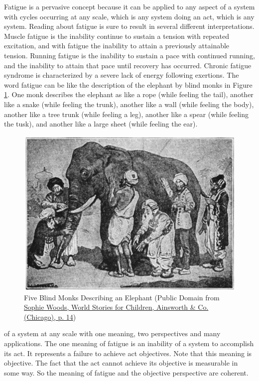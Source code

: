 Fatigue is a pervasive concept because it can be applied to any aspect of a system with cycles occurring at any scale, which is any system doing an act, which is any system. Reading about fatigue is sure to result in several different interpretations. Muscle fatigue is the inability continue to sustain a tension with repeated excitation, and with fatigue the inability to attain a previously attainable tension. Running fatigue is the inability to sustain a pace with continued running, and the inability to attain that pace until recovery has occurred. Chronic fatigue syndrome is characterized by a severe lack of energy following exertions. The word fatigue can be like the description of the elephant by blind monks in Figure \ref{fig:elephant}. One monk describes the elephant as like a rope (while feeling the tail), another like a snake (while feeling the trunk), another like a wall (while feeling the body), another like a tree trunk (while feeling a leg), another like a spear (while feeling the tusk), and another like a large sheet (while feeling the ear).    

\begin{figure}[!h]
    \centering
    \includegraphics[width=1\linewidth]{./figure/elephant.jpg}
    \caption{Five Blind Monks Describing an Elephant (\footnotesize{Public Domain from \href{https://commons.wikimedia.org/wiki/File:Blind_men_and_elephant.png}{Sophie Woods, World Stories for Children, Ainsworth & Co. (Chicago), p. 14}})}
    \label{fig:elephant}
\end{figure}

of a system at any scale with one meaning, two perspectives and many applications. The one meaning of fatigue is an inability of a system\footnotemark{} to accomplish its act. It represents a failure to achieve act objectives. Note that this meaning is objective. The fact that the act cannot achieve its objective is measurable in some way. So the meaning of fatigue and the objective perspective are coherent. 

